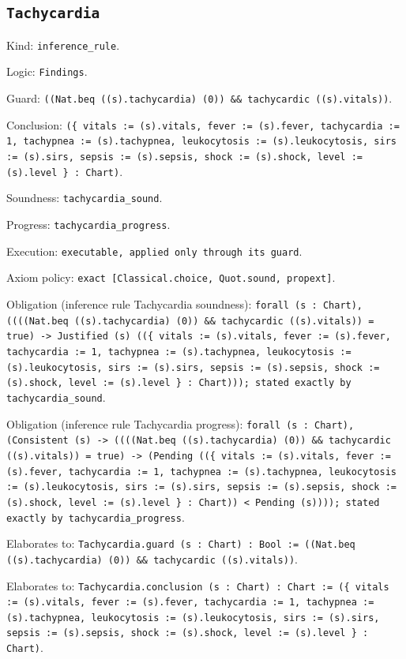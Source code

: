 \documentclass[11pt]{article}
\begin{document}
\subsection*{\texttt{Tachycardia}}
\noindent Kind: \texttt{inference_rule}.\par
\noindent Logic: \texttt{Findings}.\par
\noindent Guard: \texttt{((Nat.beq ((s).tachycardia) (0)) \&\& tachycardic ((s).vitals))}.\par
\noindent Conclusion: \texttt{(\{ vitals := (s).vitals, fever := (s).fever, tachycardia := 1, tachypnea := (s).tachypnea, leukocytosis := (s).leukocytosis, sirs := (s).sirs, sepsis := (s).sepsis, shock := (s).shock, level := (s).level \} : Chart)}.\par
\noindent Soundness: \texttt{tachycardia\_sound}.\par
\noindent Progress: \texttt{tachycardia\_progress}.\par
\noindent Execution: \texttt{executable, applied only through its guard}.\par
\noindent Axiom policy: \texttt{exact [Classical.choice, Quot.sound, propext]}.\par
\noindent Obligation (inference rule Tachycardia soundness): \texttt{forall (s : Chart), ((((Nat.beq ((s).tachycardia) (0)) \&\& tachycardic ((s).vitals)) = true) -> Justified (s) ((\{ vitals := (s).vitals, fever := (s).fever, tachycardia := 1, tachypnea := (s).tachypnea, leukocytosis := (s).leukocytosis, sirs := (s).sirs, sepsis := (s).sepsis, shock := (s).shock, level := (s).level \} : Chart))); stated exactly by tachycardia\_sound}.\par
\noindent Obligation (inference rule Tachycardia progress): \texttt{forall (s : Chart), (Consistent (s) -> ((((Nat.beq ((s).tachycardia) (0)) \&\& tachycardic ((s).vitals)) = true) -> (Pending ((\{ vitals := (s).vitals, fever := (s).fever, tachycardia := 1, tachypnea := (s).tachypnea, leukocytosis := (s).leukocytosis, sirs := (s).sirs, sepsis := (s).sepsis, shock := (s).shock, level := (s).level \} : Chart)) < Pending (s)))); stated exactly by tachycardia\_progress}.\par
\noindent Elaborates to: \texttt{Tachycardia.guard (s : Chart) : Bool := ((Nat.beq ((s).tachycardia) (0)) \&\& tachycardic ((s).vitals))}.\par
\noindent Elaborates to: \texttt{Tachycardia.conclusion (s : Chart) : Chart := (\{ vitals := (s).vitals, fever := (s).fever, tachycardia := 1, tachypnea := (s).tachypnea, leukocytosis := (s).leukocytosis, sirs := (s).sirs, sepsis := (s).sepsis, shock := (s).shock, level := (s).level \} : Chart)}.\par
\end{document}
